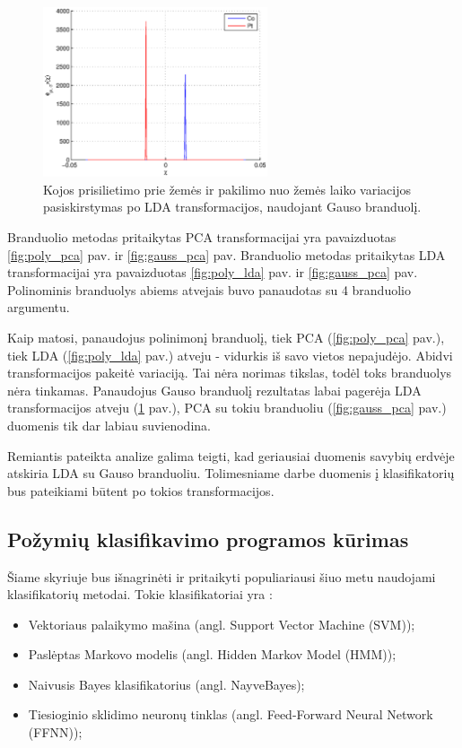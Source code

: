 \documentclass[]{vgtuef}
\begin{document}
\begin{figure}[!t]
  \centering
  \includegraphics[width=250px]{figures/st_sw_gauss_gda.eps}
  \caption{Kojos prisilietimo prie žemės ir pakilimo nuo žemės laiko
    variacijos pasiskirstymas po LDA transformacijos, naudojant Gauso branduolį.}
  \label{fig:gauss_lda}
\end{figure}

Branduolio metodas pritaikytas PCA transformacijai yra pavaizduotas \ref{fig:poly_pca} pav. ir \ref{fig:gauss_pca} pav. Branduolio metodas pritaikytas LDA transformacijai yra pavaizduotas \ref{fig:poly_lda} pav. ir \ref{fig:gauss_pca} pav. Polinominis branduolys abiems atvejais buvo panaudotas su 4 branduolio argumentu.

Kaip matosi, panaudojus polinimonį branduolį, tiek PCA (\ref{fig:poly_pca} pav.), tiek LDA (\ref{fig:poly_lda} pav.) atveju - vidurkis iš savo vietos nepajudėjo. Abidvi transformacijos pakeitė variaciją. Tai nėra norimas tikslas, todėl toks branduolys nėra tinkamas. Panaudojus Gauso branduolį rezultatas labai pagerėja LDA transformacijos atveju (\ref{fig:gauss_lda} pav.), PCA su tokiu branduoliu (\ref{fig:gauss_pca} pav.) duomenis tik dar labiau suvienodina.

Remiantis pateikta analize galima teigti, kad geriausiai duomenis savybių erdvėje atskiria LDA su Gauso branduoliu. Tolimesniame darbe duomenis į klasifikatorių bus pateikiami būtent po tokios transformacijos.

\subsection{Požymių klasifikavimo programos kūrimas}

Šiame skyriuje bus išnagrinėti ir pritaikyti populiariausi šiuo metu naudojami klasifikatorių metodai. Tokie klasifikatoriai yra \cite{824819}:

\begin{itemize}
\item Vektoriaus palaikymo mašina (angl. Support Vector Machine (SVM));
\item Paslėptas Markovo modelis (angl. Hidden Markov Model (HMM));
\item Naivusis Bayes klasifikatorius (angl. NayveBayes);
\item Tiesioginio sklidimo neuronų tinklas (angl. Feed-Forward Neural Network (FFNN));
\end{itemize}
\end{document}
